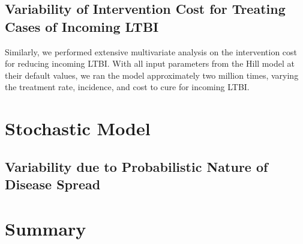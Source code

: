 \documentclass{article}[11pt]
\begin{document}

\subsection{Variability of Intervention Cost for Treating Cases of Incoming LTBI}
Similarly, we performed extensive multivariate analysis on the intervention cost for reducing incoming LTBI.  With all input parameters from the Hill model at their default values, we ran the model approximately two million times, varying the treatment rate, incidence, and cost to cure for incoming LTBI.  \\


\section{Stochastic Model}
\subsection{Variability due to Probabilistic Nature of Disease Spread}

\section{Summary}
\end{document}
